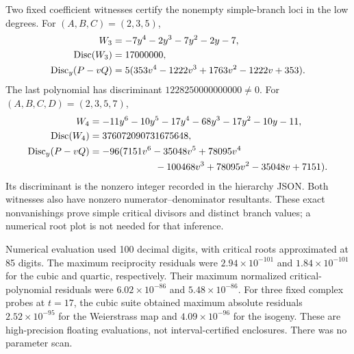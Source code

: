 Two fixed coefficient witnesses certify the nonempty simple-branch loci in the low degrees. For \((A,B,C)=(2,3,5)\),
\begin{align}\label{eq:witness3}
 W_3&=-7y^4-2y^3-7y^2-2y-7,\notag\\
 \operatorname{Disc}(W_3)&=17000000,\notag\\
 \operatorname{Disc}_y(P-vQ)&=5(353v^4-1222v^3+1763v^2-1222v+353).
\end{align}
The last polynomial has discriminant \(1228250000000000\ne0\). For \((A,B,C,D)=(2,3,5,7)\),
\begin{align}\label{eq:witness4}
 W_4&=-11y^6-10y^5-17y^4-68y^3-17y^2-10y-11,\notag\\
 \Disc(W_4)&=376072090731675648,\notag\\
 \Disc_y(P-vQ)&=-96(7151v^6-35048v^5+78095v^4\notag\\
 &\hspace{24mm}-100468v^3+78095v^2-35048v+7151).
\end{align}
Its discriminant is the nonzero integer recorded in the hierarchy JSON. Both witnesses also have nonzero numerator--denominator resultants. These exact nonvanishings prove simple critical divisors and distinct branch values; a numerical root plot is not needed for that inference.

Numerical evaluation used 100 decimal digits, with critical roots approximated at 85 digits. The maximum reciprocity residuals were \(2.94\times10^{-101}\) and \(1.84\times10^{-101}\) for the cubic and quartic, respectively. Their maximum normalized critical-polynomial residuals were \(6.02\times10^{-86}\) and \(5.48\times10^{-86}\). For three fixed complex probes at \(t=17\), the cubic suite obtained maximum absolute residuals \(2.52\times10^{-95}\) for the Weierstrass map and \(4.09\times10^{-96}\) for the isogeny. These are high-precision floating evaluations, not interval-certified enclosures. There was no parameter scan.

